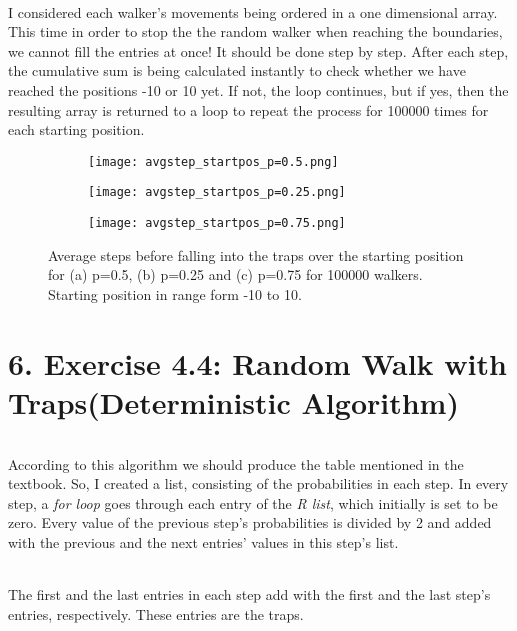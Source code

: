 \documentclass[12pt]{article}
\begin{document}
\paragraph*{} I considered each walker's movements being ordered in a one dimensional array. This time in order to stop the the random walker when reaching the boundaries, we cannot fill the entries at once! It should be done step by step. 
After each step, the cumulative sum is being calculated instantly to check whether we have reached the positions -10 or 10 yet. If not, the loop continues, but if yes, then the resulting array is returned to a loop to repeat the process for 100000 times for each starting position. 
\begin{figure}[H]
	\centering
	\begin{subfigure}[t]{0.8\textwidth}
		\texttt{[image: avgstep\_startpos\_p=0.5.png]}
		\label{fig:mesh1.1}
		\caption{}
	\end{subfigure}
	\begin{subfigure}[t]{0.45\textwidth}
		\texttt{[image: avgstep\_startpos\_p=0.25.png]}
		\label{fig:mesh1.2}
		\caption{}
	\end{subfigure}\hfill
		\begin{subfigure}[t]{0.45\textwidth}
		\texttt{[image: avgstep\_startpos\_p=0.75.png]}
		\label{fig:mesh1.2}
		\caption{}
	\end{subfigure}
	\label{fig:mesh1}
	\caption{Average steps before falling into the traps over the starting position for (a) p=0.5, (b) p=0.25 and (c) p=0.75 for 100000 walkers. Starting position in range form -10 to 10.}
\end{figure}
\part*{6. Exercise 4.4: Random Walk with Traps(Deterministic Algorithm)}
\paragraph*{} According to this algorithm we should produce the table mentioned in the textbook. So, I created a list, consisting of the probabilities in each step. In every step, a \textit{for loop} goes through each entry of the \textit{R list}, which initially is set to be zero. Every value of the previous step's probabilities is divided by 2 and added with the previous and the next entries' values in this step's list. 
\paragraph*{} The first and the last entries in each step add with the first and the last step's entries, respectively. These entries are the traps.
\end{document}

